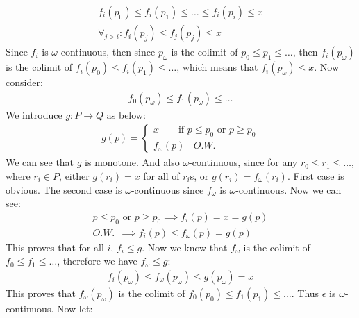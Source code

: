         \begin{gather*}
            f_i(p_0) \le f_i(p_1) \le \dots \le f_i(p_i) \le x \\
            \forall_{j > i}: f_i(p_j) \le f_j(p_j) \le x
        \end{gather*}
        Since $f_i$ is $\omega$-continuous, then since $p_\omega$ is the colimit of $p_0 \le p_1 \le \dots$, then $f_i(p_\omega)$ is the colimit of $f_i(p_0) \le f_i(p_1) \le \dots$, which means that $f_i(p_\omega) \le x$. Now consider:
        \begin{gather*}
            f_0(p_\omega) \le f_1(p_\omega) \le \dots
        \end{gather*}
        We introduce $g: P \to Q$ as below:
        \begin{gather*}
            g(p) = \begin{cases}
                x \ \ \ \ \ \ \ \ \ \text{if } p \le p_0 \text{ or } p \ge p_0 \\
                f_\omega(p) \ \ \ \ O.W.
            \end{cases}
        \end{gather*}
        We can see that $g$ is monotone. And also $\omega$-continuous, since for any $r_0 \le r_1 \le \dots$, where $r_i \in P$, either $g(r_i) = x$ for all of $r_i$s, or $g(r_i) = f_\omega(r_i)$. First case is obvious. The second case is $\omega$-continuous since $f_\omega$ is $\omega$-continuous. Now we can see:
        \begin{gather*}
            p \le p_0 \text{ or } p \ge p_0 \implies f_i(p) = x = g(p) \\
            O.W. \ \  \implies f_i(p) \le f_\omega(p) = g(p)
        \end{gather*}
        This proves that for all $i$, $f_i \le g$. Now we know that $f_\omega$ is the colimit of $f_0 \le f_1 \le \dots$, therefore we have $f_\omega \le g$:
        \begin{gather*}
            f_i(p_\omega) \le f_\omega(p_\omega) \le g(p_\omega) = x
        \end{gather*}
        This proves that $f_\omega(p_\omega)$ is the colimit of $f_0(p_0) \le f_1(p_1) \le \dots$. Thus $\epsilon$ is $\omega$-continuous.
        Now let:
        \begin{center}
        \end{center}
